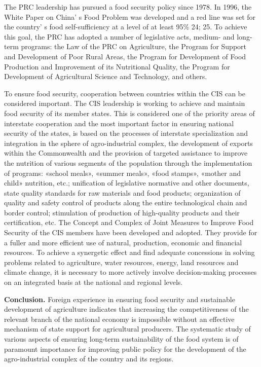 \begin{multicols}{2}
The PRC leadership has pursued a food security policy since 1978. In
1996, the White Paper on China' s Food Problem was
developed and a red line was set for the country' s food
self-sufficiency at a level of at least 95\% 24; 25. To achieve this
goal, the PRC has adopted a number of legislative acts, medium- and
long-term programs: the Law of the PRC on Agriculture, the Program for
Support and Development of Poor Rural Areas, the Program for Development
of Food Production and Improvement of its Nutritional Quality, the
Program for Development of Agricultural Science and Technology, and
others.

To ensure food security, cooperation between countries within the CIS
can be considered important. The CIS leadership is working to achieve
and maintain food security of its member states. This is considered one
of the priority areas of interstate cooperation and the most important
factor in ensuring national security of the states, is based on the
processes of interstate specialization and integration in the sphere of
agro-industrial complex, the development of exports within the
Commonwealth and the provision of targeted assistance to improve the
nutrition of various segments of the population through the
implementation of programs: «school meals», «summer meals», «food
stamps», «mother and child» nutrition, etc.; unification of legislative
normative and other documents, state quality standards for raw materials
and food products; organization of quality and safety control of
products along the entire technological chain and border control;
stimulation of production of high-quality products and their
certification, etc. The Concept and Complex of Joint Measures to Improve
Food Security of the CIS members have been developed and adopted. They
provide for a fuller and more efficient use of natural, production,
economic and financial resources. To achieve a synergetic effect and
find adequate concessions in solving problems related to agriculture,
water resources, energy, land resources and climate change, it is
necessary to more actively involve decision-making processes on an
integrated basis at the national and regional levels.

{\bfseries Conclusion.} Foreign experience in ensuring food security and
sustainable development of agriculture indicates that increasing the
competitiveness of the relevant branch of the national economy is
impossible without an effective mechanism of state support for
agricultural producers. The systematic study of various aspects of
ensuring long-term sustainability of the food system is of paramount
importance for improving public policy for the development of the
agro-industrial complex of the country and its regions.


\end{multicols}
